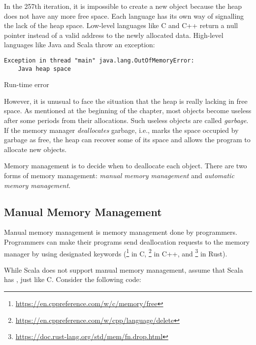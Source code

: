 In the 257th iteration, it is impossible to create a new object because the heap
does not have any more free space. Each language has its own way of signalling
the lack of the heap space. Low-level languages like C and C++ return a null
pointer instead of a valid address to the newly allocated data. High-level
languages like Java and Scala throw an exception:

\begin{mdframed}[hidealllines=true,backgroundcolor=red!10,innerleftmargin=3pt,innerrightmargin=3pt,leftmargin=-3pt,rightmargin=-3pt]
\begin{verbatim}
Exception in thread "main" java.lang.OutOfMemoryError:
    Java heap space
\end{verbatim}
\vspace{-2em}
\begin{flushright}
\scriptsize\textsf{Run-time error}
\end{flushright}
\end{mdframed}

However, it is unusual to face the situation that the heap is really lacking in
free space. As mentioned at the beginning of the chapter, most objects become
useless after some periods from their allocations. Such useless objects are
called \textit{garbage}. If the memory manager
\textit{deallocates} garbage, i.e., marks the space occupied
by garbage as free, the heap can recover some of its space and allows the
program to allocate new objects.

Memory management is to decide when to deallocate each object.  There are two
forms of memory management: \textit{manual memory management} and \textit{automatic memory management}.

\subsection{Manual Memory Management}

Manual memory management is memory management done by programmers. Programmers
can make their programs send deallocation requests to the memory manager by
using designated keywords
(\footnote{\url{https://en.cppreference.com/w/c/memory/free}} in C,
\footnote{\url{https://en.cppreference.com/w/cpp/language/delete}} in C++,
and \footnote{\url{https://doc.rust-lang.org/std/mem/fn.drop.html}} in Rust).

While Scala does not support manual memory management, assume that Scala has
, just like C. Consider the following code:

